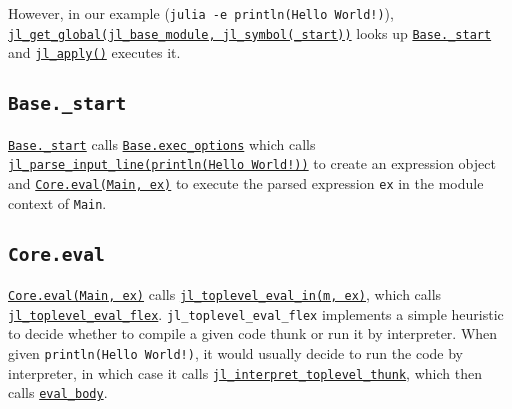 However, in our example (\texttt{julia -e {\textquotesingle}println({\textquotedbl}Hello World!{\textquotedbl}){\textquotesingle}}), \href{https://github.com/JuliaLang/julia/blob/master/src/module.c}{\texttt{jl\_get\_global(jl\_base\_module, jl\_symbol({\textquotedbl}\_start{\textquotedbl}))}} looks up \href{https://github.com/JuliaLang/julia/blob/master/base/client.jl}{\texttt{Base.\_start}} and \href{https://github.com/JuliaLang/julia/blob/master/src/julia.h}{\texttt{jl\_apply()}} executes it.



\hypertarget{12561163861893339364}{}


\subsection{\texttt{Base.\_start}}



\href{https://github.com/JuliaLang/julia/blob/master/base/client.jl}{\texttt{Base.\_start}} calls \href{https://github.com/JuliaLang/julia/blob/master/base/client.jl}{\texttt{Base.exec\_options}} which calls \href{https://github.com/JuliaLang/julia/blob/master/src/ast.c}{\texttt{jl\_parse\_input\_line({\textquotedbl}println({\textquotedbl}Hello World!{\textquotedbl}){\textquotedbl})}} to create an expression object and \hyperlink{2345597220715550879}{\texttt{Core.eval(Main, ex)}} to execute the parsed expression \texttt{ex} in the module context of \texttt{Main}.



\hypertarget{4809506034778288898}{}


\subsection{\texttt{Core.eval}}



\hyperlink{2345597220715550879}{\texttt{Core.eval(Main, ex)}} calls \href{https://github.com/JuliaLang/julia/blob/master/src/toplevel.c}{\texttt{jl\_toplevel\_eval\_in(m, ex)}}, which calls \href{https://github.com/JuliaLang/julia/blob/master/src/toplevel.c}{\texttt{jl\_toplevel\_eval\_flex}}. \texttt{jl\_toplevel\_eval\_flex} implements a simple heuristic to decide whether to compile a given code thunk or run it by interpreter. When given \texttt{println({\textquotedbl}Hello World!{\textquotedbl})}, it would usually decide to run the code by interpreter, in which case it calls \href{https://github.com/JuliaLang/julia/blob/master/src/interpreter.c}{\texttt{jl\_interpret\_toplevel\_thunk}}, which then calls \href{https://github.com/JuliaLang/julia/blob/master/src/interpreter.c}{\texttt{eval\_body}}.



